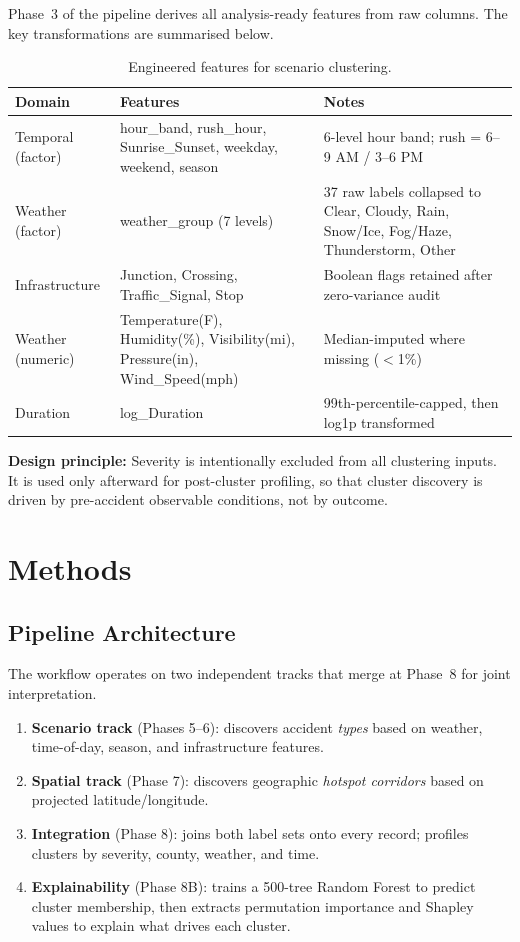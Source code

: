 \documentclass[11pt,letterpaper]{article}
\begin{document}
Phase~3 of the pipeline derives all analysis-ready features from raw columns. The key transformations are summarised below.

\begin{table}[H]
\centering
\small
\caption{Engineered features for scenario clustering.}
\begin{tabular}{@{}llp{6.5cm}@{}}
\toprule
\textbf{Domain} & \textbf{Features} & \textbf{Notes} \\
\midrule
Temporal (factor) & hour\_band, rush\_hour, Sunrise\_Sunset, weekday, weekend, season & 6-level hour band; rush = 6--9 AM / 3--6 PM \\
Weather (factor) & weather\_group (7 levels) & 37 raw labels collapsed to Clear, Cloudy, Rain, Snow/Ice, Fog/Haze, Thunderstorm, Other \\
Infrastructure & Junction, Crossing, Traffic\_Signal, Stop & Boolean flags retained after zero-variance audit \\
Weather (numeric) & Temperature(F), Humidity(\%), Visibility(mi), Pressure(in), Wind\_Speed(mph) & Median-imputed where missing ($<$1\%) \\
Duration & log\_Duration & 99th-percentile-capped, then log1p transformed \\
\bottomrule
\end{tabular}
\end{table}

\textbf{Design principle:} Severity is intentionally excluded from all clustering inputs. It is used only afterward for post-cluster profiling, so that cluster discovery is driven by pre-accident observable conditions, not by outcome.

\section{Methods}

\subsection{Pipeline Architecture}

The workflow operates on two independent tracks that merge at Phase~8 for joint interpretation.

\begin{enumerate}[nosep]
\item \textbf{Scenario track} (Phases 5--6): discovers accident \emph{types} based on weather, time-of-day, season, and infrastructure features.
\item \textbf{Spatial track} (Phase 7): discovers geographic \emph{hotspot corridors} based on projected latitude/longitude.
\item \textbf{Integration} (Phase 8): joins both label sets onto every record; profiles clusters by severity, county, weather, and time.
\item \textbf{Explainability} (Phase 8B): trains a 500-tree Random Forest to predict cluster membership, then extracts permutation importance and Shapley values to explain what drives each cluster.
\end{enumerate}
\end{document}
